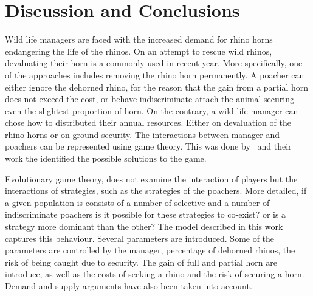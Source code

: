 \documentclass[10pt]{article}
\begin{document}


\section{Discussion and Conclusions}

Wild life managers are faced with the increased demand for rhino horns endangering
the life of the rhinos. On an attempt to rescue wild rhinos, devaluating their horn
is a commonly used in recent year.  More specifically, one of the approaches 
includes removing the rhino horn permanently.  A poacher can either
ignore the dehorned rhino, for the reason that the gain from a partial horn does
not exceed the cost, or behave indiscriminate attach the animal securing even
the slightest proportion of horn.  On the contrary, a wild
life manager can chose how to distributed their annual resources. Either
on devaluation of the rhino horns or on ground security. The interactions
between manager and poachers can be represented using game theory. This
was done by~\cite{Lee} and their work the identified the possible solutions
to the game.

Evolutionary game theory, does not examine the interaction of players but the
interactions of strategies, such as the strategies of the poachers. More detailed,
if a given population is consists of a number of selective and a number of 
indiscriminate poachers is it possible for these strategies to co-exist? or 
is a strategy more dominant than the other? The model described in this
work captures this behaviour.  Several parameters are introduced. Some of
the parameters are controlled by the manager, percentage of dehorned rhinos,
the risk of being caught due to security. The gain of full and partial horn are
introduce, as well as the costs of seeking a rhino and the risk of securing 
a horn.  Demand and supply arguments have also been taken into account.
\end{document}
